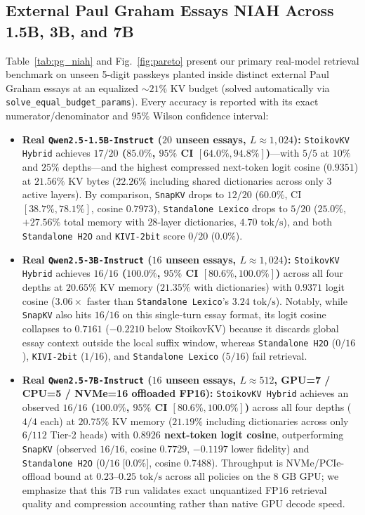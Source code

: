 \documentclass[conference]{IEEEtran}
\begin{document}
\subsection{External Paul Graham Essays NIAH Across 1.5B, 3B, and 7B}
Table~\ref{tab:pg_niah} and Fig.~\ref{fig:pareto} present our primary real-model retrieval benchmark on unseen 5-digit passkeys planted inside distinct external Paul Graham essays at an equalized $\sim 21\%$ KV budget (solved automatically via \texttt{solve\_equal\_budget\_params}). Every accuracy is reported with its exact numerator/denominator and $95\%$ Wilson confidence interval:
\begin{itemize}
    \item \textbf{Real \texttt{Qwen2.5-1.5B-Instruct} ($20$ unseen essays, $L \approx 1{,}024$):} \texttt{StoikovKV Hybrid} achieves \textbf{$17/20$ ($85.0\%$, $95\%$ CI $[64.0\%, 94.8\%]$)}---with $5/5$ at $10\%$ and $25\%$ depths---and the highest compressed next-token logit cosine ($0.9351$) at $21.56\%$ KV bytes ($22.26\%$ including shared dictionaries across only $3$ active layers). By comparison, \texttt{SnapKV} drops to $12/20$ ($60.0\%$, CI $[38.7\%, 78.1\%]$, cosine $0.7973$), \texttt{Standalone Lexico} drops to $5/20$ ($25.0\%$, $+27.56\%$ total memory with $28$-layer dictionaries, $4.70\text{ tok/s}$), and both \texttt{Standalone H2O} and \texttt{KIVI-2bit} score $0/20$ ($0.0\%$).
    \item \textbf{Real \texttt{Qwen2.5-3B-Instruct} ($16$ unseen essays, $L \approx 1{,}024$):} \texttt{StoikovKV Hybrid} achieves \textbf{$16/16$ ($100.0\%$, $95\%$ CI $[80.6\%, 100.0\%]$)} across all four depths at $20.65\%$ KV memory ($21.35\%$ with dictionaries) with $0.9371$ logit cosine ($3.06\times$ faster than \texttt{Standalone Lexico}'s $3.24\text{ tok/s}$). Notably, while \texttt{SnapKV} also hits $16/16$ on this single-turn essay format, its logit cosine collapses to $0.7161$ ($-0.2210$ below StoikovKV) because it discards global essay context outside the local suffix window, whereas \texttt{Standalone H2O} ($0/16$), \texttt{KIVI-2bit} ($1/16$), and \texttt{Standalone Lexico} ($5/16$) fail retrieval.
    \item \textbf{Real \texttt{Qwen2.5-7B-Instruct} ($16$ unseen essays, $L \approx 512$, GPU=7 / CPU=5 / NVMe=16 offloaded FP16):} \texttt{StoikovKV Hybrid} achieves an observed \textbf{$16/16$ ($100.0\%$, $95\%$ CI $[80.6\%, 100.0\%]$)} across all four depths ($4/4$ each) at $20.75\%$ KV memory ($21.19\%$ including dictionaries across only $6/112$ Tier-2 heads) with \textbf{$0.8926$ next-token logit cosine}, outperforming \texttt{SnapKV} (observed $16/16$, cosine $0.7729$, $-0.1197$ lower fidelity) and \texttt{Standalone H2O} ($0/16$ [$0.0\%$], cosine $0.7488$). Throughput is NVMe/PCIe-offload bound at $0.23$--$0.25\text{ tok/s}$ across all policies on the $8\text{ GB}$ GPU; we emphasize that this 7B run validates exact unquantized FP16 retrieval quality and compression accounting rather than native GPU decode speed.
\end{itemize}
\end{document}
